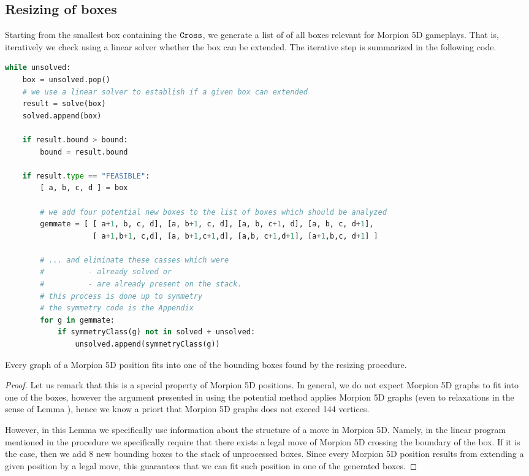 \subsection{Resizing of boxes}
Starting from the smallest box containing the $\texttt{Cross}$, we generate a list of of all boxes relevant for 
Morpion 5D gameplays. That is, iteratively we check using a linear solver whether the box can be extended. 
The iterative step is summarized in the following code.
\begin{lstlisting}[language = Python,
  basicstyle=\ttfamily\scriptsize,keywordstyle=\color{red},backgroundcolor=\color{white}]
while unsolved:
    box = unsolved.pop()
    # we use a linear solver to establish if a given box can extended
    result = solve(box)         
    solved.append(box)

    if result.bound > bound:
        bound = result.bound
        
    if result.type == "FEASIBLE":
        [ a, b, c, d ] = box

        # we add four potential new boxes to the list of boxes which should be analyzed
        gemmate = [ [ a+1, b, c, d], [a, b+1, c, d], [a, b, c+1, d], [a, b, c, d+1],
                    [ a+1,b+1, c,d], [a, b+1,c+1,d], [a,b, c+1,d+1], [a+1,b,c, d+1] ]
        
        # ... and eliminate these casses which were 
        #          - already solved or 
        #          - are already present on the stack.
        # this process is done up to symmetry 
        # the symmetry code is the Appendix             
        for g in gemmate:
            if symmetryClass(g) not in solved + unsolved:
                unsolved.append(symmetryClass(g))
\end{lstlisting}

\begin{lemma}
Every graph of a Morpion 5D position fits into one of the bounding boxes found by the resizing procedure.   
\end{lemma}

\begin{proof}
Let us remark that this is a special property of Morpion 5D positions. In general, we do not expect Morpion 5D graphs to fit into one of the boxes, however the argument presented 
in \cite{demaine} using the potential method applies Morpion 5D graphs (even to relaxations in the sense of Lemma ), hence we know a priort that Morpion 5D graphs
does not exceed 144 vertices. 

However, in this Lemma we specifically use information about the structure of a move in Morpion 5D. Namely, in the linear program mentioned in the procedure we specifically require that there 
exists a legal move of Morpion 5D crossing the boundary of the box. If it is the case, then we add $8$ new bounding boxes to the stack of unprocessed boxes. Since every
Morpion 5D position results from extending a given position by a legal move, this guarantees that we can fit such position in one of the generated boxes. 
\end{proof} 

